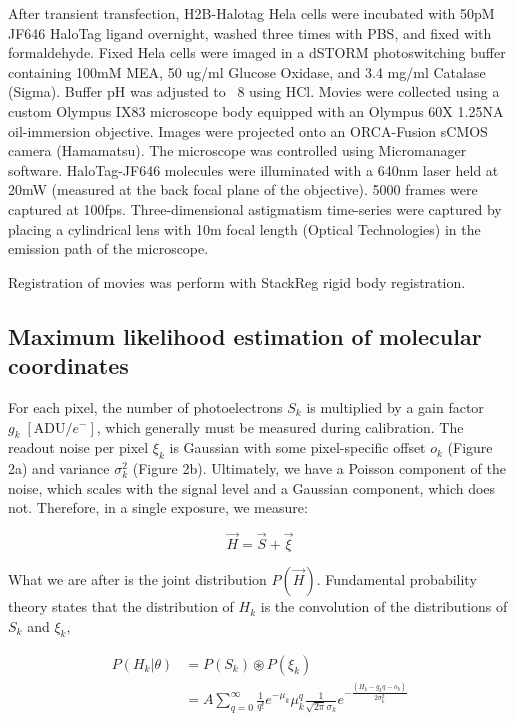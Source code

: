 \documentclass{ucetd}
\begin{document}
After transient transfection, H2B-Halotag Hela cells were incubated with 50pM JF646 HaloTag ligand overnight, washed three times with PBS, and fixed with formaldehyde. Fixed Hela cells were imaged in a dSTORM photoswitching buffer containing 100mM MEA, 50 ug/ml Glucose Oxidase, and 3.4 mg/ml Catalase (Sigma). Buffer pH was adjusted to ~8 using HCl. Movies were collected using a custom Olympus IX83 microscope body equipped with an Olympus 60X 1.25NA oil-immersion objective. Images were projected onto an ORCA-Fusion sCMOS camera (Hamamatsu). The microscope was controlled using Micromanager software. HaloTag-JF646 molecules were illuminated with a 640nm laser held at 20mW (measured at the back focal plane of the objective).  5000 frames were captured at 100fps. Three-dimensional astigmatism time-series were captured by placing a cylindrical lens with 10m focal length (Optical Technologies) in the emission path of the microscope.  

Registration of movies was perform with StackReg rigid body registration. 

\subsection{Maximum likelihood estimation of molecular coordinates}

For each pixel, the number of photoelectrons $S_{k}$ is  multiplied by a gain factor $g_{k} \;[\mathrm{ADU}/e^{-}]$, which generally must be measured during calibration. The readout noise per pixel $\xi_{k}$ is Gaussian with some pixel-specific offset $o_{k}$ (Figure 2a) and variance $\sigma_{k}^{2}$ (Figure 2b). Ultimately, we have a Poisson component of the noise, which scales with the signal level and a Gaussian component, which does not. Therefore, in a single exposure, we measure: 

\begin{equation}
\vec{H} = \vec{S} + \vec{\xi}
\end{equation}

What we are after is the joint distribution $P(\vec{H})$. Fundamental probability theory states that the distribution of $H_{k}$ is the convolution of the distributions of $S_{k}$ and $\xi_{k}$,

\begin{align}
P(H_{k}|\theta) &= P(S_{k})\circledast P(\xi_{k})\\
&= A\sum_{q=0}^{\infty} \frac{1}{q!}e^{-\mu_{k}}\mu_{k}^{q}\frac{1}{\sqrt{2\pi}\sigma_{k}}e^{-\frac{(H_{k}-g_{k}q-o_{k})}{2\sigma_{k}^{2}}}
\end{align}
\end{document}
